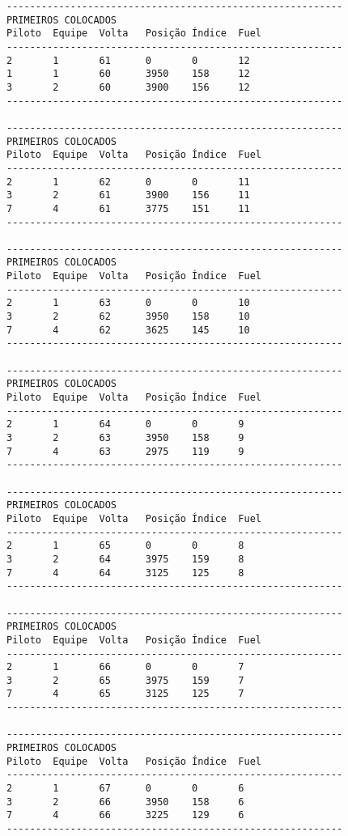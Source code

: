 \documentclass[12pt]{article}
\begin{document}
\begin{verbatim}
----------------------------------------------------------
PRIMEIROS COLOCADOS
Piloto  Equipe  Volta   Posição Índice  Fuel
----------------------------------------------------------
2       1       61      0       0       12
1       1       60      3950    158     12
3       2       60      3900    156     12
----------------------------------------------------------

----------------------------------------------------------
PRIMEIROS COLOCADOS
Piloto  Equipe  Volta   Posição Índice  Fuel
----------------------------------------------------------
2       1       62      0       0       11
3       2       61      3900    156     11
7       4       61      3775    151     11
----------------------------------------------------------

----------------------------------------------------------
PRIMEIROS COLOCADOS
Piloto  Equipe  Volta   Posição Índice  Fuel
----------------------------------------------------------
2       1       63      0       0       10
3       2       62      3950    158     10
7       4       62      3625    145     10
----------------------------------------------------------

----------------------------------------------------------
PRIMEIROS COLOCADOS
Piloto  Equipe  Volta   Posição Índice  Fuel
----------------------------------------------------------
2       1       64      0       0       9
3       2       63      3950    158     9
7       4       63      2975    119     9
----------------------------------------------------------

----------------------------------------------------------
PRIMEIROS COLOCADOS
Piloto  Equipe  Volta   Posição Índice  Fuel
----------------------------------------------------------
2       1       65      0       0       8
3       2       64      3975    159     8
7       4       64      3125    125     8
----------------------------------------------------------

----------------------------------------------------------
PRIMEIROS COLOCADOS
Piloto  Equipe  Volta   Posição Índice  Fuel
----------------------------------------------------------
2       1       66      0       0       7
3       2       65      3975    159     7
7       4       65      3125    125     7
----------------------------------------------------------

----------------------------------------------------------
PRIMEIROS COLOCADOS
Piloto  Equipe  Volta   Posição Índice  Fuel
----------------------------------------------------------
2       1       67      0       0       6
3       2       66      3950    158     6
7       4       66      3225    129     6
----------------------------------------------------------


\end{verbatim}
\end{document}
